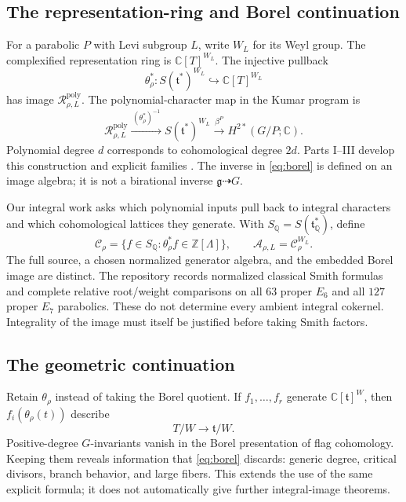 \documentclass[11pt]{article}
\newcommand{\C}{\mathbb C}
\newcommand{\Q}{\mathbb Q}
\newcommand{\Z}{\mathbb Z}
\newcommand{\g}{\mathfrak g}
\newcommand{\h}{\mathfrak t}
\begin{document}
\subsection{The representation-ring and Borel continuation}

For a parabolic $P$ with Levi subgroup $L$, write $W_L$ for its Weyl group. The complexified representation ring is $\C[T]^{W_L}$. The injective pullback
\[
 \theta_\rho^*:S(\h^*)^{W_L}\hookrightarrow\C[T]^{W_L}
\]
has image $\mathcal R_{\rho,L}^{\mathrm{poly}}$. The polynomial-character map in the Kumar program is
\begin{equation}\label{eq:borel}
 \mathcal R_{\rho,L}^{\mathrm{poly}}
 \xrightarrow{\,(\theta_\rho^*)^{-1}\,}
 S(\h^*)^{W_L}
 \xrightarrow{\,\beta^P\,}H^{2*}(G/P;\C).
\end{equation}
Polynomial degree $d$ corresponds to cohomological degree $2d$. Parts I--III develop this construction and explicit families \cite{Kumar,KR,KX}. The inverse in \eqref{eq:borel} is defined on an image algebra; it is not a birational inverse $\g\dashrightarrow G$.

Our integral work asks which polynomial inputs pull back to integral characters and which cohomological lattices they generate. With $S_\Q=S(\h_\Q^*)$, define
\[
 \mathcal C_\rho=\{f\in S_\Q:\theta_\rho^*f\in\Z[\Lambda]\},
 \qquad \mathcal A_{\rho,L}=\mathcal C_\rho^{W_L}.
\]
The full source, a chosen normalized generator algebra, and the embedded Borel image are distinct. The repository records normalized classical Smith formulas and complete relative root/weight comparisons on all $63$ proper $E_6$ and all $127$ proper $E_7$ parabolics. These do not determine every ambient integral cokernel. Integrality of the image must itself be justified before taking Smith factors.

\subsection{The geometric continuation}

Retain $\theta_\rho$ instead of taking the Borel quotient. If $f_1,\ldots,f_r$ generate $\C[\h]^W$, then $f_i(\theta_\rho(t))$ describe
\[
 T/W\longrightarrow\h/W.
\]
Positive-degree $G$-invariants vanish in the Borel presentation of flag cohomology. Keeping them reveals information that \eqref{eq:borel} discards: generic degree, critical divisors, branch behavior, and large fibers. This extends the use of the same explicit formula; it does not automatically give further integral-image theorems.
\end{document}
